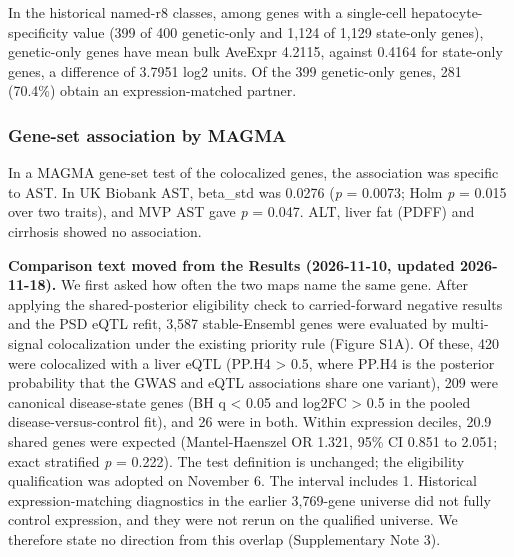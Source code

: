 In the historical named-r8 classes, among genes with a single-cell hepatocyte-specificity value (399 of 400 genetic-only and 1,124 of 1,129 state-only genes), genetic-only genes have mean bulk AveExpr 4.2115, against 0.4164 for state-only genes, a difference of 3.7951 log2 units. Of the 399 genetic-only genes, 281 (70.4\%) obtain an expression-matched partner.

\subsubsection{Gene-set association by MAGMA}\label{gene-set-association-by-magma}

In a MAGMA gene-set test of the colocalized genes, the association was specific to AST. In UK Biobank AST, beta\_\allowbreak{}std was 0.0276 (\emph{p} = 0.0073; Holm \emph{p} = 0.015 over two traits), and MVP AST gave \emph{p} = 0.047. ALT, liver fat (PDFF) and cirrhosis showed no association.

\textbf{Comparison text moved from the Results (2026-11-10, updated 2026-11-18).} We first asked how often the two maps name the same gene. After applying the shared-posterior eligibility check to carried-forward negative results and the PSD eQTL refit, 3,587 stable-Ensembl genes were evaluated by multi-signal colocalization under the existing priority rule (Figure S1A). Of these, 420 were colocalized with a liver eQTL (PP.H4 \textgreater{} 0.5, where PP.H4 is the posterior probability that the GWAS and eQTL associations share one variant), 209 were canonical disease-state genes (BH q \textless{} 0.05 and \textbar log2FC\textbar{} \textgreater{} 0.5 in the pooled disease-versus-control fit), and 26 were in both. Within expression deciles, 20.9 shared genes were expected (Mantel-Haenszel OR 1.321, 95\% CI 0.851 to 2.051; exact stratified \emph{p} = 0.222). The test definition is unchanged; the eligibility qualification was adopted on November 6. The interval includes 1. Historical expression-matching diagnostics in the earlier 3,769-gene universe did not fully control expression, and they were not rerun on the qualified universe. We therefore state no direction from this overlap (Supplementary Note 3).

